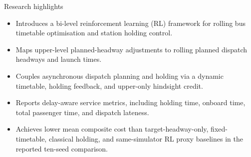 \documentclass[10pt]{article}
\begin{document}
\begin{center}
{\Large Research highlights}
\end{center}

\begin{itemize}
  \item Introduces a bi-level reinforcement learning (RL) framework for rolling bus timetable optimisation and station holding control.
  \item Maps upper-level planned-headway adjustments to rolling planned dispatch headways and launch times.
  \item Couples asynchronous dispatch planning and holding via a dynamic timetable, holding feedback, and upper-only hindsight credit.
  \item Reports delay-aware service metrics, including holding time, onboard time, total passenger time, and dispatch lateness.
  \item Achieves lower mean composite cost than target-headway-only, fixed-timetable, classical holding, and same-simulator RL proxy baselines in the reported ten-seed comparison.
\end{itemize}
\end{document}
